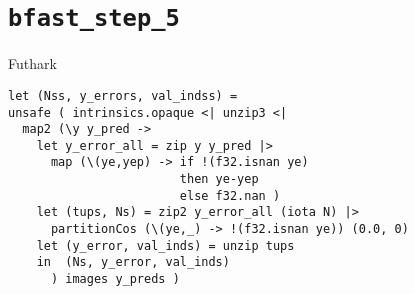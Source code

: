 \section{\texttt{bfast\_step\_5}} %


\begin{frame}[fragile]{Futhark}

%
\begin{verbatim}
let (Nss, y_errors, val_indss) =
unsafe ( intrinsics.opaque <| unzip3 <|
  map2 (\y y_pred ->
    let y_error_all = zip y y_pred |>
      map (\(ye,yep) -> if !(f32.isnan ye) 
                        then ye-yep 
                        else f32.nan )
    let (tups, Ns) = zip2 y_error_all (iota N) |>
      partitionCos (\(ye,_) -> !(f32.isnan ye)) (0.0, 0)
    let (y_error, val_inds) = unzip tups
    in  (Ns, y_error, val_inds)
      ) images y_preds )
\end{verbatim}

\end{frame}

